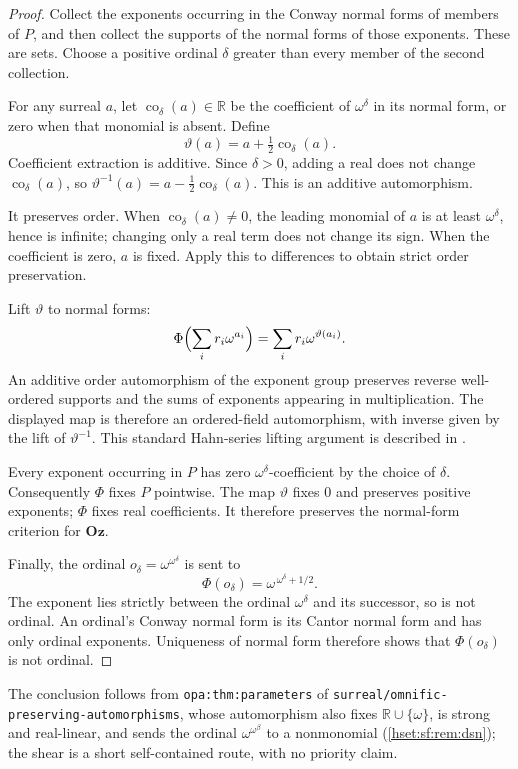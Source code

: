 \documentclass[11pt,letterpaper]{article}
\theoremstyle{definition}
\theoremstyle{remark}
\newcommand{\lbl}[1]{\nolinkurl{#1}}
\newcommand{\repo}[1]{\nolinkurl{#1}}
\newcommand{\Oz}{\mathbf{Oz}}
\newcommand{\R}{\mathbb R}
\begin{document}
\begin{proof}
Collect the exponents occurring in the Conway normal forms of members of $P$, and
then collect the supports of the normal forms of those exponents. These are sets.
Choose a positive ordinal $\delta$ greater than every member of the second
collection.

For any surreal $a$, let $\operatorname{co}_\delta(a)\in\R$ be the coefficient of
$\omega^\delta$ in its normal form, or zero when that monomial is absent. Define
\[
 \vartheta(a)=a+\tfrac12\operatorname{co}_\delta(a).
\]
Coefficient extraction is additive. Since $\delta>0$, adding a real does not
change $\operatorname{co}_\delta(a)$, so
$\vartheta^{-1}(a)=a-\tfrac12\operatorname{co}_\delta(a)$. This is an additive
automorphism.

It preserves order. When $\operatorname{co}_\delta(a)\ne0$, the leading monomial
of $a$ is at least $\omega^\delta$, hence is infinite; changing only a real term
does not change its sign. When the coefficient is zero, $a$ is fixed. Apply this to
differences to obtain strict order preservation.

Lift $\vartheta$ to normal forms:
\[
 \Phi\Bigl(\sum_i r_i\omega^{a_i}\Bigr)=\sum_i r_i\omega^{\vartheta(a_i)}.
\]
An additive order automorphism of the exponent group preserves reverse
well-ordered supports and the sums of exponents appearing in multiplication. The
displayed map is therefore an ordered-field automorphism, with inverse given by the
lift of $\vartheta^{-1}$. This standard Hahn-series lifting argument is described
in \cite{KKS}.

Every exponent occurring in $P$ has zero $\omega^\delta$-coefficient by the choice
of $\delta$. Consequently $\Phi$ fixes $P$ pointwise. The map $\vartheta$ fixes $0$
and preserves positive exponents; $\Phi$ fixes real coefficients. It therefore
preserves the normal-form criterion for $\Oz$.

Finally, the ordinal $o_\delta=\omega^{\omega^\delta}$ is sent to
\[
 \Phi(o_\delta)=\omega^{\,\omega^\delta+1/2}.
\]
The exponent lies strictly between the ordinal $\omega^\delta$ and its successor,
so is not ordinal. An ordinal's Conway normal form is its Cantor normal form and
has only ordinal exponents. Uniqueness of normal form therefore shows that
$\Phi(o_\delta)$ is not ordinal.
\end{proof}

The conclusion follows from \lbl{opa:thm:parameters} of
\repo{surreal/omnific-preserving-automorphisms}, whose automorphism also fixes
$\R\cup\{\omega\}$, is strong and real-linear, and sends the ordinal
$\omega^{\omega^\beta}$ to a nonmonomial (\cref{hset:sf:rem:dsn}); the shear is a
short self-contained route, with no priority claim.
\end{document}
